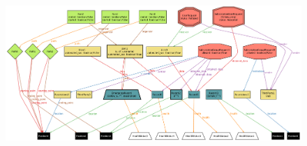 \newpage

\begin{figure}[H]
    \centering
    \includegraphics[angle=90, scale=0.4]{./Pictures/alloy/alloy-world.png}
\end{figure}




